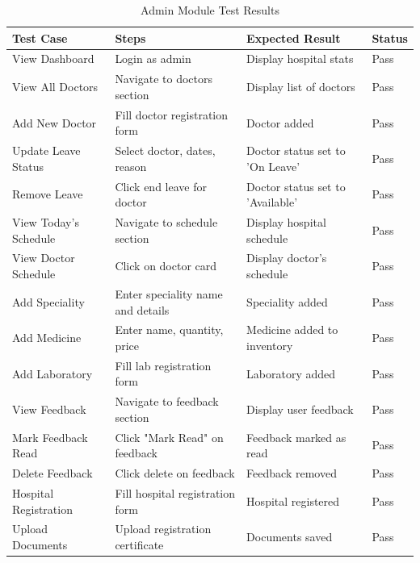 \begin{table}[H]
    \centering
    \small
    \vspace{-0.5\baselineskip}

    \setlength{\tabcolsep}{2pt}
    \begin{tabular}{|p{2.5cm}|p{3.8cm}|p{2.2cm}|p{1.2cm}|}
        \hline
        \textbf{Test Case} & \textbf{Steps} & \textbf{Expected Result} & \textbf{Status} \\
        \hline
        View Dashboard & Login as admin & Display hospital stats & Pass \\
        \hline
        View All Doctors & Navigate to doctors section & Display list of doctors & Pass \\
        \hline
        Add New Doctor & Fill doctor registration form & Doctor added & Pass \\
        \hline
        Update Leave Status & Select doctor, dates, reason & Doctor status set to 'On Leave' & Pass \\
        \hline
        Remove Leave & Click end leave for doctor & Doctor status set to 'Available' & Pass \\
        \hline
        View Today's Schedule & Navigate to schedule section & Display hospital schedule & Pass \\
        \hline
        View Doctor Schedule & Click on doctor card & Display doctor's schedule & Pass \\
        \hline
        Add Speciality & Enter speciality name and details & Speciality added & Pass \\
        \hline
        Add Medicine & Enter name, quantity, price & Medicine added to inventory & Pass \\
        \hline
        Add Laboratory & Fill lab registration form & Laboratory added & Pass \\
        \hline
        View Feedback & Navigate to feedback section & Display user feedback & Pass \\
        \hline
        Mark Feedback Read & Click "Mark Read" on feedback & Feedback marked as read & Pass \\
        \hline
        Delete Feedback & Click delete on feedback & Feedback removed & Pass \\
        \hline
        Hospital Registration & Fill hospital registration form & Hospital registered & Pass \\
        \hline
        Upload Documents & Upload registration certificate & Documents saved & Pass \\
        \hline
    \end{tabular}
  \caption{Admin Module Test Results}
  \label{tab:admin-tests}
\end{table}

